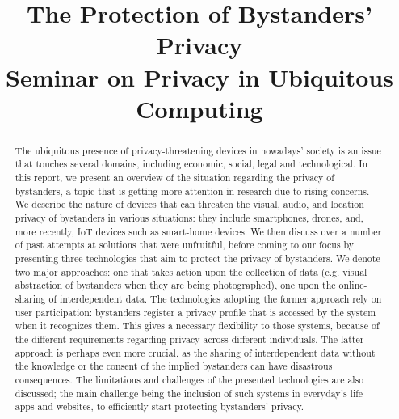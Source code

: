 \documentclass[conference]{IEEEtran}
\begin{document}
\title{The Protection of Bystanders' Privacy\\Seminar on Privacy in Ubiquitous Computing}

\author{
\and
{} 
}

\maketitle
\thispagestyle{plain} %
\pagestyle{plain}    %

\begin{abstract}
The ubiquitous presence of privacy-threatening devices in nowadays' society is an issue that touches several domains, including economic, social, legal and technological. In this report, we present an overview of the situation regarding the privacy of bystanders, a topic that is getting more attention in research due to rising concerns. We describe the nature of devices that can threaten the visual, audio, and location privacy of bystanders in various situations: they include smartphones, drones, and, more recently, \ac{IoT} devices such as smart-home devices. We then discuss over a number of past attempts at solutions that were unfruitful, before coming to our focus by presenting three technologies that aim to protect the privacy of bystanders. We denote two major approaches: one that takes action upon the collection of data (e.g. visual abstraction of bystanders when they are being photographed), one upon the online-sharing of interdependent data. The technologies adopting the former approach rely on user participation: bystanders register a privacy profile that is accessed by the system when it recognizes them. This gives a necessary flexibility to those systems, because of the different requirements regarding privacy across different individuals. The latter approach is perhaps even more crucial, as the sharing of interdependent data without the knowledge or the consent of the implied bystanders can have disastrous consequences. The limitations and challenges of the presented technologies are also discussed; the main challenge being the inclusion of such systems in everyday's life apps and websites, to efficiently start protecting bystanders' privacy.
\end{abstract}
\end{document}
